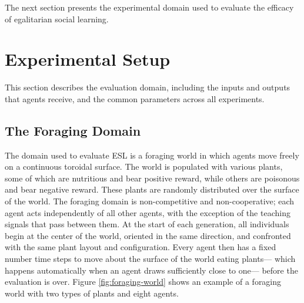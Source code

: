 \documentclass{sig-alternate}
\begin{document}


The next section presents the experimental domain used to evaluate the efficacy of egalitarian social learning.

\section{Experimental Setup}
\label{sec:setup}
This section describes the evaluation domain, including the inputs and outputs that agents receive, and the common parameters across all experiments.

\subsection{The Foraging Domain}
The domain used to evaluate ESL is a foraging world in which agents move freely on a continuous toroidal surface. The world is populated with various plants, some of which are nutritious and bear positive reward, while others are poisonous and bear negative reward. These plants are randomly distributed over the surface of the world. The foraging domain is non-competitive and non-cooperative; each agent acts independently of all other agents, with the exception of the teaching signals that pass between them. At the start of each generation, all individuals begin at the center of the world, oriented in the same direction, and confronted with the same plant layout and configuration. Every agent then has a fixed number time steps to move about the surface of the world eating plants--- which happens automatically when an agent draws sufficiently close to one--- before the evaluation is over. Figure \ref{fig:foraging-world} shows an example of a foraging world with two types of plants and eight agents.
    
\end{document}
